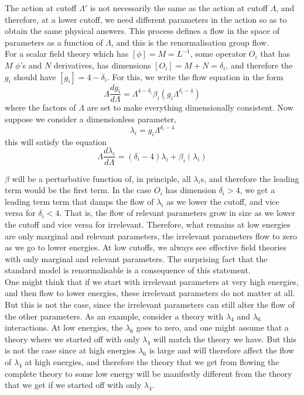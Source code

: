 \documentclass[11pt]{article}
\numberwithin{equation}{section}
\begin{document}
The action at cutoff \(\Lambda'\) is not necessarily the same as the action at cutoff \(\Lambda\), and therefore, at a lower cutoff, we need different parameters in the action so as to obtain the same physical answers. This process defines a flow in the space of parameters as a function of \(\Lambda\), and this is the renormalisation group flow.\\ 

For a scalar field theory which has \([\phi] = M = L^{-1}\), some operator \(O_i\) that has \(M\) \(\phi\)'s and \(N\) derivatives, has dimensions \([O_i] = M+N = \delta_i\), and therefore the \(g_i\) should have \([g_i] = 4- \delta_i\). For this, we write the flow equation in the form 
\begin{equation*}
    \Lambda \frac{dg_i}{d\Lambda} = \Lambda^{4 - \delta_i} \beta_i(g_i\Lambda^{\delta_i-4})
\end{equation*}
where the factors of \(\Lambda\) are set to make everything dimensionally consistent. Now suppose we consider a dimensionless parameter, 
\begin{equation*}
    \lambda_i = g_i \Lambda^{\delta_i - 4}
\end{equation*}
this will satisfy the equation
\begin{equation}
    \Lambda \frac{d\lambda_i}{d\Lambda} = (\delta_i - 4) \lambda_i + \beta_i(\lambda_i)
    \label{eq:rgflow}
\end{equation}

\(\beta\) will be a perturbative function of, in principle, all \(\lambda_i\)s, and therefore the leading term would be the first term. In the case \(O_i\) has dimension \(\delta_i > 4\), we get a leading term term that damps the flow of \(\lambda_i\) as we lower the cutoff, and vice versa for \(\delta_i < 4\). That is, the flow of relevant parameters grow in size as we lower the cutoff and vice versa for irrelevant. Therefore, what remains at low energies are only marginal and relevant parameters, the irrelevant parameters flow to zero as we go to lower energies. At low cutoffs, we always see effective field theories with only marginal and relevant parameters. The surprising fact that the standard model is renormalisable is a consequence of this statement. \\

One might think that if we start with irrelevant parameters at very high energies, and then flow to lower energies, these irrelevant parameters do not matter at all. But this is not the case, since the irrelevant parameters can still alter the flow of the other parameters. As an example, consider a theory with \(\lambda_4\) and \(\lambda_6\) interactions. At low energies, the \(\lambda_6\) goes to zero, and one might assume that a theory where we started off with only \(\lambda_4\) will match the theory we have. But this is not the case since at high energies \(\lambda_6\) is large and will therefore affect the flow of \(\lambda_4\) at high energies, and therefore the theory that we get from flowing the complete theory to some low energy will be manifestly different from the theory that we get if we started off with only \(\lambda_4\).\\
\end{document}
